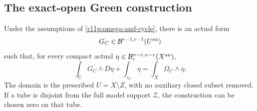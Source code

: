 \subsection{The exact-open Green construction}

\begin{theorem}
\label{r11p:complex-green}
Under the assumptions of \eqref{r11p:omega-and-cycle}, there is an
actual form
\[
                       G_C\in\mathcal B^{r-1,r-1}(U^{\rm an})
\]
such that, for every compact actual
$\eta\in\mathcal B_c^{n-r,n-r}(X^{\rm an})$,
\[
                 \int_UG_C\wedge D\eta+\int_{z_C}\eta
                                     =\int_X\Omega_C\wedge\eta.
\tag{PC7}\label{r11p:complex-green-equation}
\]
The domain is the prescribed $U=X\setminus Z$, with no auxiliary
closed subset removed.  If a tube is disjoint from the full model
support $\mathcal Z$, the construction can be chosen zero on that tube.
\end{theorem}

